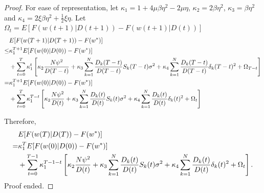 \documentclass{article}
\theoremstyle{plain}
\theoremstyle{definition}
\theoremstyle{remark}
\begin{document}
\begin{proof}
  For ease of representation, let $\kappa_1 = 1 + 4\mu\beta\eta^2 - 2\mu\eta$, $\kappa_2 = 2\beta\eta^2$, $\kappa_3 = \beta\eta^2$ and $\kappa_4 = 2\xi\beta\eta^2 + \frac{1}{2}\xi\eta$.
  Let $\Omega_{t}=E[F(w(t+1)|D(t+1)) - F(w(t+1)|D(t))]$
  \begin{align}
         & E[F(w(T+1)|D(T+1)) - F(w^*)] \notag \\
    \leq & \kappa_1^{T+1} E[F(w(0)|D(0))-F(w^*)] \notag \\
         & + \sum_{t=0}^T\kappa_1^t \left[\kappa_2 \frac{N\psi^2}{D(T-t)} + \kappa_3 \sum_{k=1}^{N} \frac{D_k(T-t)}{D(T-t)} S_k(T-t) \sigma^2 + \kappa_4\sum_{k=1}^{N} \frac{D_k(T-t)}{D(T-t)} \delta_k(T-t)^2 + \Omega_{T-t} \right] \notag \\
    =    & \kappa_1^{T+1} E[F(w(0)|D(0))-F(w^*)] \notag \\
         & + \sum_{t=0}^{T}\kappa_1^{T-t} \left[\kappa_2 \frac{N\psi^2}{D(t)} + \kappa_3 \sum_{k=1}^{N} \frac{D_k(t)}{D(t)} S_k(t) \sigma^2 + \kappa_4\sum_{k=1}^{N} \frac{D_k(t)}{D(t)} \delta_k(t)^2 + \Omega_{t}\right] \notag \\
  \end{align}

  Therefore,
  \begin{align}
      & E[F(w(T)|D(T)) - F(w^*)] \notag \\ 
    = & \kappa_1^{T} E[F(w(0)|D(0))-F(w^*)] \notag \\
      & + \sum_{t=0}^{T-1}\kappa_1^{T-1-t} \left[\kappa_2 \frac{N\psi^2}{D(t)} + \kappa_3 \sum_{k=1}^{N} \frac{D_k(t)}{D(t)} S_k(t) \sigma^2 + \kappa_4\sum_{k=1}^{N} \frac{D_k(t)}{D(t)} \delta_k(t)^2 + \Omega_{t}\right]. \notag \\ 
  \end{align}
  Proof ended.
\end{proof}
\end{document}
